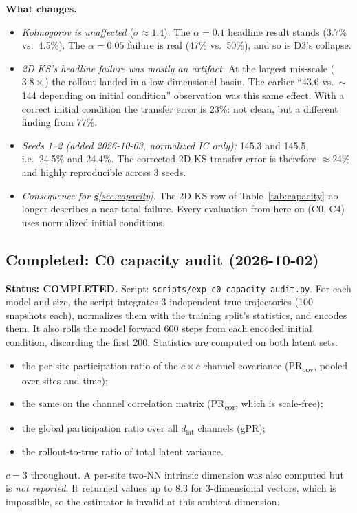 \documentclass[11pt]{article}
\begin{document}
\textbf{What changes.}
\begin{itemize}[leftmargin=*]
\item \emph{Kolmogorov is unaffected} ($\sigma\approx1.4$). The
  $\alpha{=}0.1$ headline result stands (3.7\% vs.\ 4.5\%). The
  $\alpha{=}0.05$ failure is real (47\% vs.\ 50\%), and so is D3's collapse.
\item \emph{2D KS's headline failure was mostly an artifact.} At the
  largest mis-scale ($3.8\times$) the rollout landed in a low-dimensional
  basin. The earlier ``43.6 vs.\ $\sim$144 depending on initial
  condition'' observation was this same effect. With a correct initial
  condition the transfer error is 23\%: not clean, but a different
  finding from 77\%.
\item \emph{Seeds 1--2 (added 2026-10-03, normalized IC only):} 145.3 and
  145.5, i.e.\ 24.5\% and 24.4\%. The corrected 2D KS transfer error is
  therefore $\approx$24\% and highly reproducible across 3 seeds.
\item \emph{Consequence for \S\ref{sec:capacity}.} The 2D KS row of
  Table~\ref{tab:capacity} no longer describes a near-total failure.
  Every evaluation from here on (C0, C4) uses normalized initial
  conditions.
\end{itemize}

\subsection{Completed: C0 capacity audit (2026-10-02)}
\label{sec:c0_results}

\textbf{Status: COMPLETED.} Script: \texttt{scripts/exp\_c0\_capacity\_audit.py}.
For each model and size, the script integrates 3 independent true
trajectories (100 snapshots each), normalizes them with the training
split's statistics, and encodes them. It also rolls the model forward 600
steps from each encoded initial condition, discarding the first 200.
Statistics are computed on both latent sets:
\begin{itemize}[leftmargin=*]
\item the per-site participation ratio of the $c{\times}c$ channel
  covariance (PR\textsubscript{cov}, pooled over sites and time);
\item the same on the channel correlation matrix (PR\textsubscript{cor},
  which is scale-free);
\item the global participation ratio over all $d_{\mathrm{lat}}$ channels
  (gPR);
\item the rollout-to-true ratio of total latent variance.
\end{itemize}
$c{=}3$ throughout. A per-site two-NN intrinsic dimension was also
computed but is \emph{not reported}. It returned values up to 8.3 for
3-dimensional vectors, which is impossible, so the estimator is invalid
at this ambient dimension.
\end{document}
